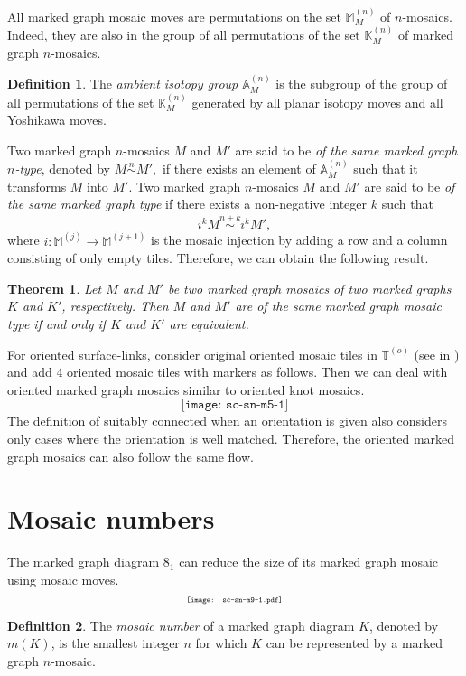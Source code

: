 \documentclass{article}
\newtheorem{theorem}{Theorem}
\theoremstyle{definition}
\newtheorem{definition}{Definition}
\begin{document}
All marked graph mosaic moves are permutations on the set $\mathbb{M}^{(n)}_{M}$ of $n$-mosaics. Indeed, they are also in the group of all permutations of the set $\mathbb{K}^{(n)}_{M}$ of marked graph $n$-mosaics.

\begin{definition}
The \textit{ambient isotopy group $\mathbb{A}^{(n)}_{M}$} is the subgroup of the group of all permutations of the set $\mathbb{K}^{(n)}_{M}$ generated by all planar isotopy moves and all Yoshikawa moves.  
\end{definition}

Two marked graph $n$-mosaics $M$ and $M'$ are said to be \textit{of the same marked graph $n$-type}, denoted by 
  $M \overset{n}{\sim} M',$
  if there exists an element of $\mathbb{A}^{(n)}_{M}$ such that it transforms $M$ into $M'$.
Two marked graph $n$-mosaics $M$ and $M'$ are said to be \textit{of the same marked graph type} 
  if there exists a non-negative integer $k$ such that 
  $$i^{k}M \overset{n+k}{\sim} i^{k}M',$$
  where $i : \mathbb{M}^{(j)} \rightarrow \mathbb{M}^{(j+1)}$ is the mosaic injection by adding a row and a column consisting of only empty tiles.
Therefore, we can obtain the following result.  
  
\begin{theorem}
Let $M$ and $M'$ be two marked graph mosaics of two marked graphs $K$ and $K'$, respectively. 
Then $M$ and $M'$ are of the same marked graph mosaic type if and only if $K$ and $K'$ are equivalent.
\end{theorem}


For oriented surface-links, consider original oriented mosaic tiles in $\mathbb{T}^{(o)}$ (see in \cite{LK}) and add 4 oriented mosaic tiles with markers as follows. 
Then we can deal with oriented marked graph mosaics similar to oriented knot mosaics. 
\[\texttt{[image: sc-sn-m5-1]}\]
The definition of suitably connected when an orientation is given also considers only cases where the orientation is well matched.
Therefore, the oriented marked graph mosaics can also follow the same flow.


\section{Mosaic numbers}

The marked graph diagram $8_1$ can reduce the size of its marked graph mosaic using mosaic moves. 
\[\scalebox{0.6}{\texttt{[image: sc-sn-m9-1.pdf]}}\]

\begin{definition}
The \textit{mosaic number} of a marked graph diagram $K$, denoted by $m(K)$, is the smallest integer $n$ for which $K$ can be represented by a marked graph $n$-mosaic.
\end{definition} 
\end{document}
